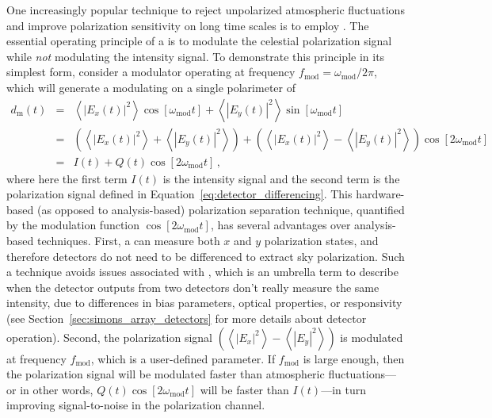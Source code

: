One increasingly popular technique to reject unpolarized atmospheric fluctuations and improve polarization sensitivity on long time scales is to employ . The essential operating principle of a  is to modulate the celestial polarization signal while \textit{not} modulating the intensity signal. To demonstrate this principle in its simplest form, consider a modulator operating at frequency $f_{\mathrm{mod}} = \omega_{\mathrm{mod}} / 2 \pi$, which will generate a modulating  on a single polarimeter of
\begin{eqnarray}
    d_{\mathrm{m}}(t) & = & \left< \left| E_{x}(t) \right|^{2} \right> \cos \left[ \omega_{\mathrm{mod}} t \right] + \left< \left| E_{y}(t) \right|^{2} \right> \sin \left[ \omega_{\mathrm{mod}} t \right] \nonumber \\
    & = & \left( \left< \left| E_{x}(t) \right|^{2} \right> + \left< \left| E_{y}(t) \right|^{2} \right> \right) + \left( \left< \left| E_{x}(t) \right|^{2} \right> - \left< \left| E_{y}(t) \right|^{2} \right> \right) \cos \left[ 2 \omega_{\mathrm{mod}} t \right] \nonumber \\
    & = & I(t) + Q(t) \cos \left[ 2 \omega_{\mathrm{mod}} t \right] \, ,
    \label{eq:polarization_modulation_basic}
\end{eqnarray}
where here the first term $I(t)$ is the intensity signal and the second term is the polarization signal defined in Equation~\ref{eq:detector_differencing}. This hardware-based (as opposed to analysis-based) polarization separation technique, quantified by the modulation function $\cos \left[ 2 \omega_{\mathrm{mod}} t \right]$, has several advantages over analysis-based techniques. First, a  can measure both $x$ and $y$ polarization states, and therefore detectors do not need to be differenced to extract sky polarization. Such a technique avoids issues associated with , which is an umbrella term to describe when the detector outputs from two detectors don't really measure the same intensity, due to differences in bias parameters, optical properties, or responsivity (see Section~\ref{sec:simons_array_detectors} for more details about detector operation). Second, the polarization signal $\left( \left< \left| E_{x} \right|^{2} \right> - \left< \left| E_{y} \right|^{2} \right> \right)$ is modulated at frequency $f_{\mathrm{mod}}$, which is a user-defined parameter. If $f_{\mathrm{mod}}$ is large enough, then the polarization signal will be modulated faster than atmospheric fluctuations---or in other words, $ Q(t) \cos \left[ 2 \omega_{\mathrm{mod}} t \right]$ will be faster than $I(t)$---in turn improving signal-to-noise in the polarization channel.

